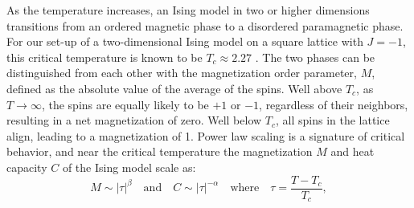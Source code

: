\documentclass[9pt,twocolumn,twoside]{pnas-new}
\begin{document}
As the temperature increases, an Ising model in two or higher dimensions transitions from an ordered magnetic phase to a disordered paramagnetic phase. For our set-up of a two-dimensional Ising model on a square lattice with $J=-1$, this critical temperature is known to be $T_c\approx2.27$ \cite{onsager-solution}. The two phases can be distinguished from each other with the magnetization order parameter, $M$, defined as the absolute value of the average of the spins. Well above $T_c$, as $T \rightarrow \infty$, the spins are equally likely to be $+1$ or $-1$, regardless of their neighbors, resulting in a net magnetization of zero. Well below $T_c$, all spins in the lattice align, leading to a magnetization of 1. Power law scaling is a signature of critical behavior, and near the critical temperature the magnetization $M$ and heat capacity $C$ of the Ising model scale as:
\begin{equation}
    M \sim |\tau|^{\beta} \quad \mathrm{and} \quad C \sim |\tau|^{-\alpha} \quad \mathrm{where} \quad \tau = \frac{T-T_c}{T_c},
\end{equation}
\end{document}
